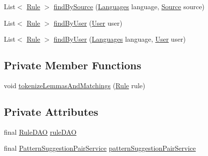 \begin{DoxyCompactItemize}
\item 
List$<$ \hyperlink{classbr_1_1usp_1_1cata_1_1model_1_1_rule}{Rule} $>$ \hyperlink{classbr_1_1usp_1_1cata_1_1service_1_1_rule_service_ad5fddf22aa4ceb598d303a1b4a2ff66f}{find\+By\+Source} (\hyperlink{enumbr_1_1usp_1_1cata_1_1model_1_1_languages}{Languages} language, \hyperlink{classbr_1_1usp_1_1cata_1_1model_1_1_source}{Source} source)
\item 
List$<$ \hyperlink{classbr_1_1usp_1_1cata_1_1model_1_1_rule}{Rule} $>$ \hyperlink{classbr_1_1usp_1_1cata_1_1service_1_1_rule_service_aca50ccd94593b8dff8a98c465850a6e7}{find\+By\+User} (\hyperlink{classbr_1_1usp_1_1cata_1_1model_1_1_user}{User} user)
\item 
List$<$ \hyperlink{classbr_1_1usp_1_1cata_1_1model_1_1_rule}{Rule} $>$ \hyperlink{classbr_1_1usp_1_1cata_1_1service_1_1_rule_service_a55cea77df6446f8453b985d8758e0883}{find\+By\+User} (\hyperlink{enumbr_1_1usp_1_1cata_1_1model_1_1_languages}{Languages} language, \hyperlink{classbr_1_1usp_1_1cata_1_1model_1_1_user}{User} user)
\end{DoxyCompactItemize}
\subsection*{Private Member Functions}
\begin{DoxyCompactItemize}
\item 
void \hyperlink{classbr_1_1usp_1_1cata_1_1service_1_1_rule_service_aeae985656bb009ef23b97a30fa6a8bea}{tokenize\+Lemmas\+And\+Matchings} (\hyperlink{classbr_1_1usp_1_1cata_1_1model_1_1_rule}{Rule} rule)
\end{DoxyCompactItemize}
\subsection*{Private Attributes}
\begin{DoxyCompactItemize}
\item 
final \hyperlink{classbr_1_1usp_1_1cata_1_1dao_1_1_rule_d_a_o}{Rule\+D\+A\+O} \hyperlink{classbr_1_1usp_1_1cata_1_1service_1_1_rule_service_aa3af0042eda8e23666ba9b97bc414dab}{rule\+D\+A\+O}
\item 
final \hyperlink{classbr_1_1usp_1_1cata_1_1service_1_1_pattern_suggestion_pair_service}{Pattern\+Suggestion\+Pair\+Service} \hyperlink{classbr_1_1usp_1_1cata_1_1service_1_1_rule_service_a34b6dc002357b8d5f00e47f891a4cf6d}{pattern\+Suggestion\+Pair\+Service}
\end{DoxyCompactItemize}


